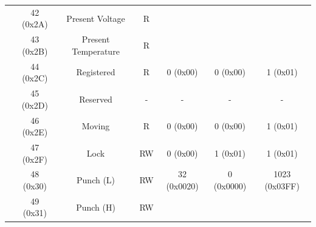 \begin{table}[htbp]
\begin{adjustwidth}{-1.9cm}{-1.5cm}
\begin{tabular}{|c|c|c|c|c|c|c|}
		\multicolumn{ 1}{|c|}{} & 42 (0x2A) & Present Voltage & R &  &  &  \\ \cline{ 2- 7}
		\multicolumn{ 1}{|c|}{} & 43 (0x2B) & Present Temperature & R &  &  &  \\ \cline{ 2- 7}
		\multicolumn{ 1}{|c|}{} & 44 (0x2C) & Registered & R & 0 (0x00) & 0 (0x00) & 1 (0x01) \\ \cline{ 2- 7}
		\multicolumn{ 1}{|c|}{} & 45 (0x2D) & Reserved & - & - & - & - \\ \cline{ 2- 7}
		\multicolumn{ 1}{|c|}{} & 46 (0x2E) & Moving & R & 0 (0x00) & 0 (0x00) & 1 (0x01) \\ \cline{ 2- 7}
		\multicolumn{ 1}{|c|}{} & 47 (0x2F) & Lock & RW & 0 (0x00) & 1 (0x01) & 1 (0x01) \\ \cline{ 2- 7}
		\multicolumn{ 1}{|c|}{} & 48 (0x30) & Punch (L) & RW & \multicolumn{ 1}{c|}{32 (0x0020)} & \multicolumn{ 1}{c|}{0 (0x0000)} & \multicolumn{ 1}{c|}{1023 (0x03FF)} \\ \cline{ 2- 4}
		\multicolumn{ 1}{|c|}{} & 49 (0x31) & Punch (H) & RW & \multicolumn{ 1}{c|}{} & \multicolumn{ 1}{c|}{} & \multicolumn{ 1}{c|}{} \\ \hline
	\end{tabular}
\end{adjustwidth}
\end{table}

